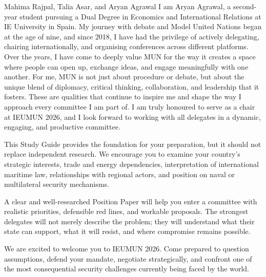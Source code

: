 \begin{chairletter}{Mahima Rajpal, Talia Asar, and Aryan Agrawal}
I am Aryan Agrawal, a second-year student pursuing a Dual Degree in Economics and International Relations at IE University in Spain. My journey with debate and Model United Nations began at the age of nine, and since 2018, I have had the privilege of actively delegating, chairing internationally, and organising conferences across different platforms. Over the years, I have come to deeply value MUN for the way it creates a space where people can open up, exchange ideas, and engage meaningfully with one another. For me, MUN is not just about procedure or debate, but about the unique blend of diplomacy, critical thinking, collaboration, and leadership that it fosters. These are qualities that continue to inspire me and shape the way I approach every committee I am part of. I am truly honoured to serve as a chair at IEUMUN 2026, and I look forward to working with all delegates in a dynamic, engaging, and productive committee.

This Study Guide provides the foundation for your preparation, but it should not replace independent research. We encourage you to examine your country’s strategic interests, trade and energy dependencies, interpretation of international maritime law, relationships with regional actors, and position on naval or multilateral security mechanisms.

A clear and well-researched Position Paper will help you enter a committee with realistic priorities, defensible red lines, and workable proposals. The strongest delegates will not merely describe the problem; they will understand what their state can support, what it will resist, and where compromise remains possible.

We are excited to welcome you to IEUMUN 2026. Come prepared to question assumptions, defend your mandate, negotiate strategically, and confront one of the most consequential security challenges currently being faced by the world.

\end{chairletter}
